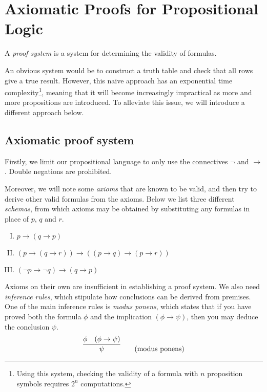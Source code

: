 \section{Axiomatic Proofs for Propositional Logic}

A \emph{proof system} is a system for determining the validity of formulas.

An obvious system would be to construct a truth table and check that all rows give a true result. However, this naive approach has an exponential time complexity\footnote{Using this system, checking the validity of a formula with \(n\) proposition symbols requires \(2^n\) computations.}, meaning that it will become increasingly impractical as more and more propositions are introduced. To alleviate this issue, we will introduce a different approach below.



\subsection{Axiomatic proof system}

Firstly, we limit our propositional language to only use the connectives \(\neg\) and \(\rightarrow\). Double negations are prohibited.

Moreover, we will note some \emph{axioms} that are known to be valid, and then try to derive other valid formulas from the axioms. Below we list three different \emph{schemas}, from which axioms may be obtained by substituting any formulas in place of \(p\), \(q\) and \(r\).
%
\begin{enumerate}[I.]
    \item \(p \rightarrow (q \rightarrow p)\)
    \item \((p \rightarrow (q \rightarrow r)) \rightarrow ((p \rightarrow q) \rightarrow (p \rightarrow r))\)
    \item \((\neg p \rightarrow \neg q) \rightarrow (q \rightarrow p)\)
\end{enumerate}

Axioms on their own are insufficient in establishing a proof system. We also need \emph{inference rules}, which stipulate how conclusions can be derived from premises. One of the main inference rules is \emph{modus ponens}, which states that if you have proved both the formula \(\phi\) and the implication \((\phi\rightarrow\psi)\), then you may deduce the conclusion \(\psi\).
%
\[
    \infer{\psi}{
        \phi
        &
        (\phi\rightarrow\psi)
    }
    \tag{modus ponens}
\]

